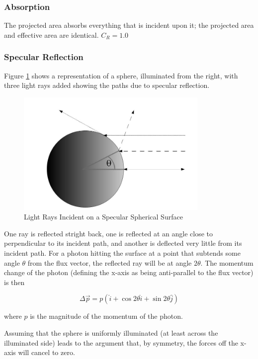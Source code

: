 \subsubsection{Absorption}
The projected area absorbs everything that is incident upon it; the
projected area and
effective area are identical.  $C_R = 1.0$

\subsubsection{Specular Reflection}
Figure \ref{fig:defaultsurfacespecular} shows a representation of a
sphere, illuminated from the right, with three light rays added showing
the paths due to specular reflection.

\begin{figure}[!ht]
\begin{center}
    \includegraphics[height=60mm]{figs/def_surf/specular.jpg}
    \end{center}
    \caption{Light Rays Incident on a Specular Spherical Surface}
    \label{fig:defaultsurfacespecular}
  \end{figure}

One ray is reflected stright back, one is reflected at an angle close
to perpendicular to its incident path, and another is deflected very
little from its incident path.  For a photon hitting the surface at a
point that subtends some angle $\theta$ from the flux vector, the
reflected ray will be at angle $2 \theta$.  The momentum change of
the photon (defining the x-axis as being anti-parallel to the flux
vector) is then

\begin{equation*}
\Delta \vec{p} = p(\hat{i} + \cos 2\theta \hat{i} + \sin 2\theta \hat j)
\end{equation*}

where $p$ is the magnitude of the momentum of the photon.

Assuming that the sphere is uniformly illuminated (at least across
the illuminated side) leads to the argument that, by symmetry, the
forces off the x-axis will cancel to zero.

